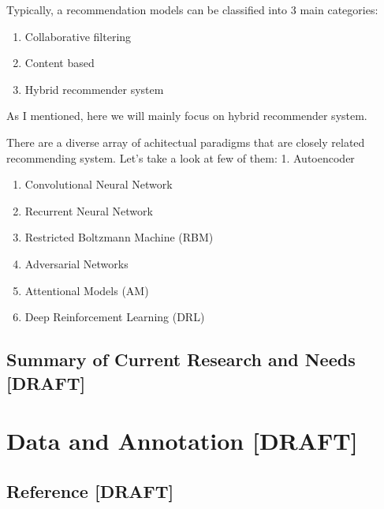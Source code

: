 \documentclass[]{book}
\theoremstyle{definition}
\theoremstyle{definition}
\theoremstyle{definition}
\theoremstyle{remark}
\begin{document}
Typically, a recommendation models can be classified into 3 main
categories:

\begin{enumerate}
\def\labelenumi{\arabic{enumi}.}
\item
  Collaborative filtering
\item
  Content based
\item
  Hybrid recommender system
\end{enumerate}

As I mentioned, here we will mainly focus on hybrid recommender system.

There are a diverse array of achitectual paradigms that are closely
related recommending system. Let's take a look at few of them: 1.
Autoencoder

\begin{enumerate}
\def\labelenumi{\arabic{enumi}.}
\setcounter{enumi}{1}
\item
  Convolutional Neural Network
\item
  Recurrent Neural Network
\item
  Restricted Boltzmann Machine (RBM)
\item
  Adversarial Networks
\item
  Attentional Models (AM)
\item
  Deep Reinforcement Learning (DRL)
\end{enumerate}

\subsection{Summary of Current Research and Needs
{[}DRAFT{]}}\label{summary-of-current-research-and-needs-draft}

\section{Data and Annotation
{[}DRAFT{]}}\label{data-and-annotation-draft}

\subsection{Reference {[}DRAFT{]}}\label{reference-draft}
\end{document}
